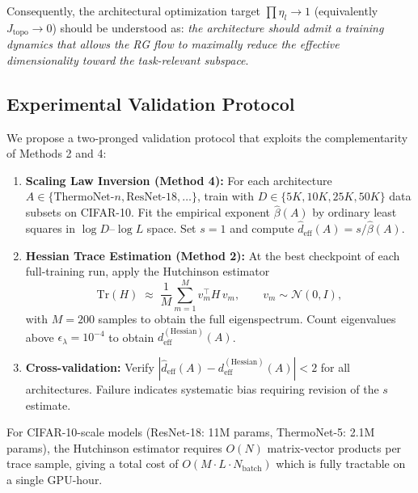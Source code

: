 \documentclass[11pt, a4paper]{article}
\theoremstyle{plain}
\begin{document}
Consequently, the architectural optimization target $\prod\eta_l \to 1$ (equivalently $J_{\mathrm{topo}} \to 0$) should be understood as: \emph{the architecture should admit a training dynamics that allows the RG flow to maximally reduce the effective dimensionality toward the task-relevant subspace}.

\subsection{Experimental Validation Protocol}
\label{sec:d_eff_validation}

We propose a two-pronged validation protocol that exploits the complementarity of Methods 2 and 4:

\begin{prot}
\label{prot:d_eff_validation}
\begin{enumerate}
    \item \textbf{Scaling Law Inversion (Method 4):} For each architecture $A \in \{\text{ThermoNet-}n, \text{ResNet-18}, \dots\}$, train with $D \in \{5K, 10K, 25K, 50K\}$ data subsets on CIFAR-10. Fit the empirical exponent $\hat{\beta}(A)$ by ordinary least squares in $\log D$--$\log L$ space. Set $s=1$ and compute $\hat{d}_{\mathrm{eff}}(A) = s / \hat{\beta}(A)$.
    \item \textbf{Hessian Trace Estimation (Method 2):} At the best checkpoint of each full-training run, apply the Hutchinson estimator
    \begin{equation}
        \mathrm{Tr}(H) \;\approx\; \frac{1}{M}\sum_{m=1}^{M} v_m^{\top} H\, v_m, \qquad v_m \sim \mathcal{N}(0,I),
        \label{eq:hutchinson}
    \end{equation}
    with $M=200$ samples to obtain the full eigenspectrum. Count eigenvalues above $\epsilon_{\lambda}=10^{-4}$ to obtain $d_{\mathrm{eff}}^{\mathrm{(Hessian)}}(A)$.
    \item \textbf{Cross-validation:} Verify $|\hat{d}_{\mathrm{eff}}(A) - d_{\mathrm{eff}}^{\mathrm{(Hessian)}}(A)| < 2$ for all architectures. Failure indicates systematic bias requiring revision of the $s$ estimate.
\end{enumerate}
\end{prot}

\begin{rema}
For CIFAR-10-scale models (ResNet-18: 11M params, ThermoNet-5: 2.1M params), the Hutchinson estimator requires $O(N)$ matrix-vector products per trace sample, giving a total cost of $O(M \cdot L \cdot N_{\mathrm{batch}})$ which is fully tractable on a single GPU-hour.
\end{rema}
\end{document}
